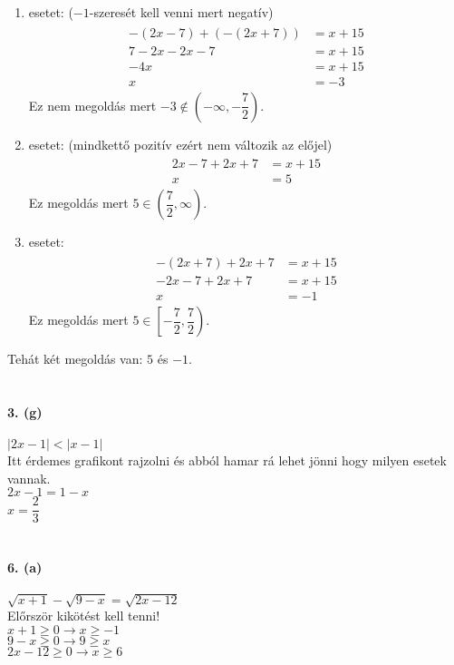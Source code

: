 \documentclass[12pt,a4paper,fleqn]{article}
\newcommand{\myparagraph}[1]{\paragraph{#1}\mbox{}}
\begin{document}
\begin{enumerate}
  \item esetet: ($-1$-szeresét kell venni mert negatív) \\
  \begin{align*}
    \begin{split}
      -(2x-7)+(-(2x+7)) &= x + 15 \\
      7-2x-2x-7&=x+15 \\
      -4x&=x+15 \\
      x &=-3
    \end{split}
  \end{align*}
  Ez nem megoldás mert $-3 \notin (-\infty, -\dfrac{7}{2})$.
  \item esetet: (mindkettő pozitív ezért nem változik az előjel)
  \begin{align*}
    \begin{split}
      2x-7+2x+7 &= x + 15 \\
      x &= 5
    \end{split}
  \end{align*}
  Ez megoldás mert $5 \in (\dfrac{7}{2}, \infty)$.
  \item esetet:
  \begin{align*}
    \begin{split}
      -(2x+7)+2x+7 &= x + 15 \\
      -2x-7+2x+7 &= x + 15 \\
      x &= -1
    \end{split}
  \end{align*}
  Ez megoldás mert $5 \in \left[ -\dfrac{7}{2}, \dfrac{7}{2} \right)$.
\end{enumerate}
Tehát két megoldás van: $5$ és $-1$.\\\\
\myparagraph{3. (g)}
$|2x-1| < |x-1|$  \\
Itt érdemes grafikont rajzolni és abból hamar rá lehet jönni
hogy milyen esetek vannak. \\
$2x-1 = 1-x$ \\
$x = \dfrac{2}{3}$ \\\\
\myparagraph{6. (a)}
$\sqrt{x+1} - \sqrt{9-x} = \sqrt{2x-12}$ \\
Előrször kikötést kell tenni! \\
$x+1 \geq 0 \rightarrow x \geq -1$ \\
$9-x \geq 0 \rightarrow 9 \geq x$ \\
$2x-12 \geq 0 \rightarrow x \geq 6$ \\
\end{document}
